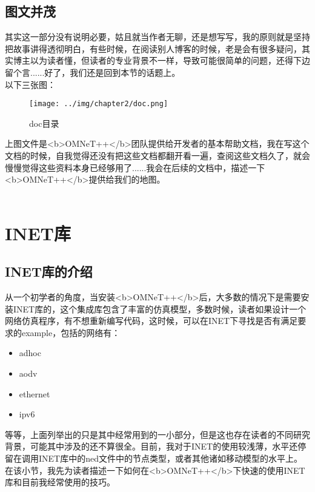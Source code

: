 \subsection{图文并茂}

其实这一部分没有说明必要，姑且就当作者无聊，还是想写写，我的原则就是坚持把故事讲得透彻明白，有些时候，在阅读别人博客的时候，老是会有很多疑问，其实博主以为读者懂，但读者的专业背景不一样，导致可能很简单的问题，还得下边留个言......好了，我们还是回到本节的话题上。\\

以下三张图：\\

\begin{figure}[H]
	\centering
	\texttt{[image: ../img/chapter2/doc.png]}
	\caption{doc目录}\label{fig:1a}	
\end{figure}

上图文件是<b>OMNeT++</b>团队提供给开发者的基本帮助文档，我在写这个文档的时候，自我觉得还没有把这些文档都翻开看一遍，查阅这些文档久了，就会慢慢觉得这些资料本身已经够用了......我会在后续的文档中，描述一下<b>OMNeT++</b>提供给我们的地图。\\ \\


\section{INET库}

\subsection{INET库的介绍}
从一个初学者的角度，当安装<b>OMNeT++</b>后，大多数的情况下是需要安装INET库的，这个集成库包含了丰富的仿真模型，多数时候，读者如果设计一个网络仿真程序，有不想重新编写代码，这时候，可以在INET下寻找是否有满足要求的example，包括的网络有：

\begin{itemize}
\item adhoc
\item aodv
\item ethernet
\item ipv6
\end{itemize}

等等，上面列举出的只是其中经常用到的一小部分，但是这也存在读者的不同研究背景，可能其中涉及的还不算很全。目前，我对于INET的使用较浅薄，水平还停留在调用INET库中的ned文件中的节点类型，或者其他诸如移动模型的水平上。在该小节，我先为读者描述一下如何在<b>OMNeT++</b>下快速的使用INET库和目前我经常使用的技巧。\\ 

